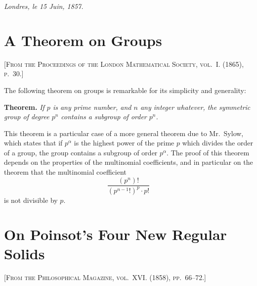 \documentclass[11pt,a4paper]{book}
\begin{document}
\medskip
\noindent\textit{Londres, le 15 Juin, 1857.}

\newpage


\section{A Theorem on Groups}

\textsc{[From the Proceedings of the London Mathematical Society, vol.~I. (1865), p.~30.]}
\label{paper:240}

\setcounter{page}{80}

The following theorem on groups is remarkable for its simplicity and generality:

\medskip
\noindent\textbf{Theorem.} \textit{If $p$ is any prime number, and $n$ any integer whatever, the symmetric group of degree $p^n$ contains a subgroup of order $p^n$.}

\medskip
This theorem is a particular case of a more general theorem due to Mr.~Sylow, which states that if $p^\alpha$ is the highest power of the prime $p$ which divides the order of a group, the group contains a subgroup of order $p^\alpha$. The proof of this theorem depends on the properties of the multinomial coefficients, and in particular on the theorem that the multinomial coefficient
\[
\frac{(p^n)!}{(p^{n-1}!)^p \cdot p!}
\]
is not divisible by $p$.

\newpage


\section{On Poinsot's Four New Regular Solids}

\textsc{[From the Philosophical Magazine, vol.~XVI. (1858), pp.~66--72.]}
\label{paper:241}

\setcounter{page}{81}
\end{document}
